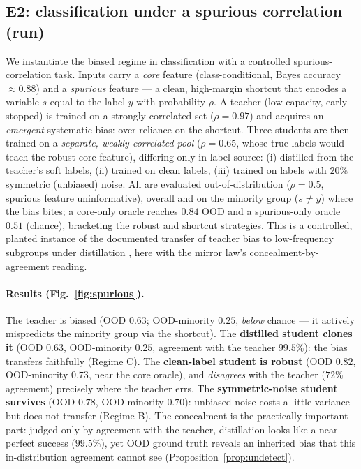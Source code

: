 \documentclass[10pt]{article} %
\theoremstyle{plain}
\theoremstyle{remark}
\begin{document}
\subsection{E2: classification under a spurious correlation (run)}
\label{sec:e2}
We instantiate the biased regime in classification with a controlled spurious-correlation task. Inputs carry a \emph{core} feature (class-conditional, Bayes accuracy $\approx 0.88$) and a \emph{spurious} feature --- a clean, high-margin shortcut that encodes a variable $s$ equal to the label $y$ with probability $\rho$. A teacher (low capacity, early-stopped) is trained on a strongly correlated set ($\rho=0.97$) and acquires an \emph{emergent} systematic bias: over-reliance on the shortcut. Three students are then trained on a \emph{separate, weakly correlated pool} ($\rho=0.65$, whose true labels would teach the robust core feature), differing only in label source: (i) distilled from the teacher's soft labels, (ii) trained on clean labels, (iii) trained on labels with $20\%$ symmetric (unbiased) noise. All are evaluated out-of-distribution ($\rho=0.5$, spurious feature uninformative), overall and on the minority group ($s\neq y$) where the bias bites; a core-only oracle reaches $0.84$ OOD and a spurious-only oracle $0.51$ (chance), bracketing the robust and shortcut strategies. This is a controlled, planted instance of the documented transfer of teacher bias to low-frequency subgroups under distillation \citep{lukasik2022}, here with the mirror law's concealment-by-agreement reading.

\paragraph{Results (Fig.~\ref{fig:spurious}).} The teacher is biased (OOD $0.63$; OOD-minority $0.25$, \emph{below} chance --- it actively mispredicts the minority group via the shortcut). The \textbf{distilled student clones it} (OOD $0.63$, OOD-minority $0.25$, agreement with the teacher $99.5\%$): the bias transfers faithfully (Regime C). The \textbf{clean-label student is robust} (OOD $0.82$, OOD-minority $0.73$, near the core oracle), and \emph{disagrees} with the teacher ($72\%$ agreement) precisely where the teacher errs. The \textbf{symmetric-noise student survives} (OOD $0.78$, OOD-minority $0.70$): unbiased noise costs a little variance but does not transfer (Regime B). The concealment is the practically important part: judged only by agreement with the teacher, distillation looks like a near-perfect success ($99.5\%$), yet OOD ground truth reveals an inherited bias that this in-distribution agreement cannot see (Proposition~\ref{prop:undetect}).
\end{document}
